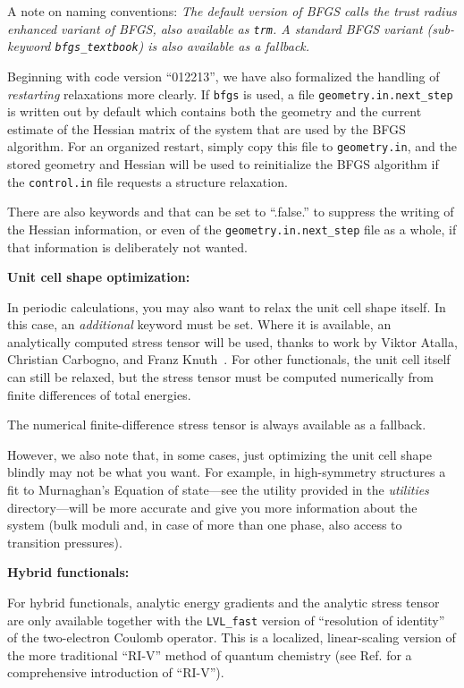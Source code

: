A note on naming conventions: \emph{The default version of BFGS calls
  the trust radius enhanced variant of BFGS, also available as
  \texttt{trm}. A standard BFGS variant (sub-keyword
  \texttt{bfgs\_textbook}) is also available as a fallback.} 

Beginning with code version ``012213'', we have also formalized the
handling of \emph{restarting} relaxations more clearly. If
 \texttt{bfgs} is used, a file
\texttt{geometry.in.next\_step} is written out by default which contains
both the geometry and the current estimate of the Hessian matrix of
the system that are used by the BFGS algorithm. For an organized
restart, simply copy this file to \texttt{geometry.in}, and the stored
geometry and Hessian will be used to reinitialize the BFGS algorithm
if the \texttt{control.in} file requests a structure relaxation.

There are also keywords  and
 that can be set to ``.false.'' to
suppress the writing of the Hessian information, or even of the
\texttt{geometry.in.next\_step} file as a whole, if that information
is deliberately not wanted. 

\textbf{Unit cell shape optimization:}

In periodic calculations, you may also want to relax the unit cell
shape itself. In this case, an \emph{additional} keyword
 must be set. Where it is available, an
analytically computed stress tensor will be used, thanks to work by
Viktor Atalla, Christian Carbogno, and Franz Knuth~\cite{Knuth2015}. For other
functionals, the unit cell itself can still be relaxed, but the stress
tensor must be computed numerically from finite differences of total
energies. 

The numerical finite-difference stress tensor is always available as a
fallback.

However, we also note that, in some cases, just optimizing the unit
cell shape blindly may not be what you want. For example, in
high-symmetry structures a fit to Murnaghan's Equation of state---see
the utility provided in the \emph{utilities} directory---will be more
accurate and give you more information about the system (bulk moduli
and, in case of more than one phase, also access to transition pressures).

\textbf{Hybrid functionals:}

For hybrid functionals, analytic energy gradients and the analytic stress 
tensor are only available together with the  
\texttt{LVL\_fast} version of ``resolution of identity'' of the two-electron 
Coulomb operator. This is a localized, linear-scaling version of the more 
traditional ``RI-V'' method of quantum chemistry (see Ref. \cite{Ren12a} for a
comprehensive introduction of ``RI-V''). 


